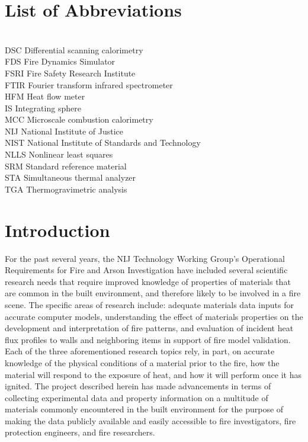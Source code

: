 \documentclass[12pt,oneside]{book}
\begin{document}
\chapter*{List of Abbreviations}

\begin{tabbing}
\hspace{1.5in} \= \\
DSC 	\> Differential scanning calorimetry \\
FDS	    \> Fire Dynamics Simulator \\
FSRI    \> Fire Safety Research Institute \\
FTIR 	\> Fourier transform infrared spectrometer \\
HFM 	\> Heat flow meter \\
IS 		\> Integrating sphere \\
MCC 	\> Microscale combustion calorimetry \\
NIJ 	\> National Institute of Justice \\
NIST    \> National Institute of Standards and Technology \\
NLLS    \> Nonlinear least squares \\
SRM 	\> Standard reference material \\
STA 	\> Simultaneous thermal analyzer \\
TGA 	\> Thermogravimetric analysis \\
\end{tabbing}

\newpage

\setcounter{page}{1}

\newpage
\mainmatter
\newpage

\chapter{Introduction}
\label{sec:introduction}

For the past several years, the NIJ Technology Working Group's Operational Requirements for Fire and Arson Investigation have included several scientific research needs that require improved knowledge of properties of materials that are common in the built environment, and therefore likely to be involved in a fire scene. The specific areas of research include: adequate materials data inputs for accurate computer models, understanding the effect of materials properties on the development and interpretation of fire patterns, and evaluation of incident heat flux profiles to walls and neighboring items in support of fire model validation. Each of the three aforementioned research topics rely, in part, on accurate knowledge of the physical conditions of a material prior to the fire, how the material will respond to the exposure of heat, and how it will perform once it has ignited. The project described herein has made advancements in terms of collecting experimental data and property information on a multitude of materials commonly encountered in the built environment for the purpose of making the data publicly available and easily accessible to fire investigators, fire protection engineers, and fire researchers.
\end{document}
